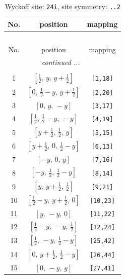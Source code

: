 \documentclass[fleqn,8pt]{jsarticle}
\begin{document}
\begin{longtable}{ccc}
\caption{Wyckoff site: {\tt 24i}, site symmetry: {\tt ..2}}
 \\
 \hline \hline
No. & position & mapping \\ \hline \endfirsthead

\multicolumn{2}{l}{\tablename\ \thetable{}} \\
 \hline \hline
No. & position & mapping \\ \hline \endhead

 \hline \hline
\multicolumn{2}{r}{\footnotesize\it continued ...} \\ \endfoot

 \hline \hline
\multicolumn{2}{r}{} \\ \endlastfoot

1 & $\left[ \frac{1}{2},\, y,\, y + \frac{1}{2} \right]$ & {\tt [1,18]} \\ \hline
2 & $\left[ 0,\, \frac{1}{2} - y,\, y + \frac{1}{2} \right]$ & {\tt [2,20]} \\ \hline
3 & $\left[ 0,\, y,\, - y \right]$ & {\tt [3,17]} \\ \hline
4 & $\left[ \frac{1}{2},\, \frac{1}{2} - y,\, - y \right]$ & {\tt [4,19]} \\ \hline
5 & $\left[ y + \frac{1}{2},\, \frac{1}{2},\, y \right]$ & {\tt [5,15]} \\ \hline
6 & $\left[ y + \frac{1}{2},\, 0,\, \frac{1}{2} - y \right]$ & {\tt [6,13]} \\ \hline
7 & $\left[ - y,\, 0,\, y \right]$ & {\tt [7,16]} \\ \hline
8 & $\left[ - y,\, \frac{1}{2},\, \frac{1}{2} - y \right]$ & {\tt [8,14]} \\ \hline
9 & $\left[ y,\, y + \frac{1}{2},\, \frac{1}{2} \right]$ & {\tt [9,21]} \\ \hline
10 & $\left[ \frac{1}{2} - y,\, y + \frac{1}{2},\, 0 \right]$ & {\tt [10,23]} \\ \hline
11 & $\left[ y,\, - y,\, 0 \right]$ & {\tt [11,22]} \\ \hline
12 & $\left[ \frac{1}{2} - y,\, - y,\, \frac{1}{2} \right]$ & {\tt [12,24]} \\ \hline
13 & $\left[ \frac{1}{2},\, - y,\, \frac{1}{2} - y \right]$ & {\tt [25,42]} \\ \hline
14 & $\left[ 0,\, y + \frac{1}{2},\, \frac{1}{2} - y \right]$ & {\tt [26,44]} \\ \hline
15 & $\left[ 0,\, - y,\, y \right]$ & {\tt [27,41]} \\ \hline

\end{longtable}
\end{document}
